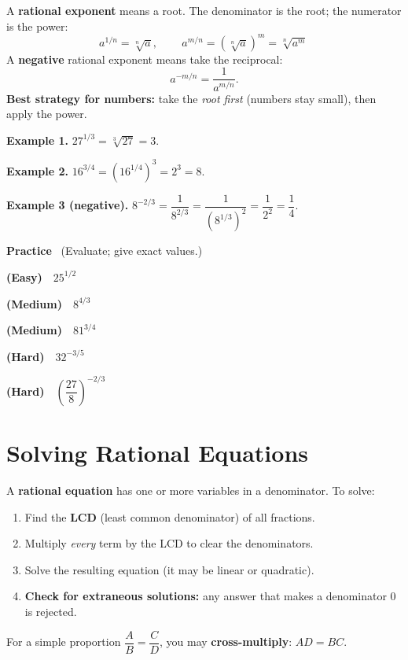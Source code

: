 \documentclass[11pt]{article}
\newcommand{\easy}{{\small\color{FangGreen}\textbf{(Easy)}}}
\newcommand{\med}{{\small\color{FangOrange}\textbf{(Medium)}}}
\newcommand{\hard}{{\small\color{FangAccent}\textbf{(Hard)}}}
\begin{document}
\begin{summary}
A \textbf{rational exponent} means a root. The denominator is the root; the numerator is the power:
\[
a^{1/n} = \sqrt[n]{a}, \qquad
\boxed{\,a^{m/n} = \left(\sqrt[n]{a}\right)^{m} = \sqrt[n]{a^{m}}\,}
\]
A \textbf{negative} rational exponent means take the reciprocal:
\[
a^{-m/n} = \frac{1}{a^{m/n}}.
\]
\textbf{Best strategy for numbers:} take the \emph{root first} (numbers stay small), then apply the power.
\end{summary}

\begin{example}
\textbf{Example 1.} $27^{1/3} = \sqrt[3]{27} = 3.$

\smallskip
\textbf{Example 2.} $16^{3/4} = \left(16^{1/4}\right)^{3} = 2^{3} = 8.$

\smallskip
\textbf{Example 3 (negative).} $8^{-2/3} = \dfrac{1}{8^{2/3}} = \dfrac{1}{\left(8^{1/3}\right)^{2}}
= \dfrac{1}{2^{2}} = \dfrac{1}{4}.$
\end{example}

\textbf{Practice} \ (Evaluate; give exact values.)
\begin{practice}
  \item \easy\ \ $25^{1/2}$
  \item \med\ \ $8^{4/3}$
  \item \med\ \ $81^{3/4}$
  \item \hard\ \ $32^{-3/5}$
  \item \hard\ \ $\left(\dfrac{27}{8}\right)^{-2/3}$
\end{practice}

\section{Solving Rational Equations}

\begin{summary}
A \textbf{rational equation} has one or more variables in a denominator. To solve:
\begin{enumerate}[leftmargin=1.5em,itemsep=1pt,topsep=2pt]
  \item Find the \textbf{LCD} (least common denominator) of all fractions.
  \item Multiply \emph{every} term by the LCD to clear the denominators.
  \item Solve the resulting equation (it may be linear or quadratic).
  \item \textbf{Check for extraneous solutions:} any answer that makes a denominator $0$ is rejected.
\end{enumerate}
For a simple proportion $\dfrac{A}{B}=\dfrac{C}{D}$, you may \textbf{cross-multiply}: $AD = BC$.
\end{summary}
\end{document}
